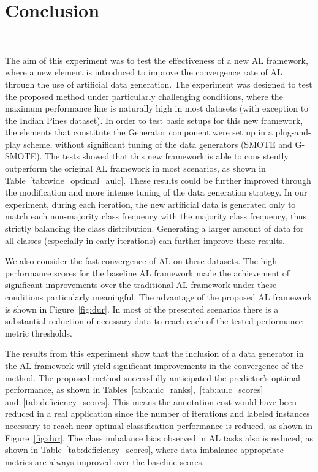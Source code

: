 \documentclass[preprint,12pt]{elsarticle}
\begin{document}
\section{Conclusion}~\label{sec:conclusion}

The aim of this experiment was to test the effectiveness of a new AL framework,
where a new element is introduced to improve the convergence rate of AL through
the use of artificial data generation. The experiment was designed to test the
proposed method under particularly challenging conditions, where the maximum
performance line is naturally high in most datasets (with exception to the
Indian Pines dataset). In order to test basic setups for this new framework,
the elements that constitute the Generator component were set up in a
plug-and-play scheme, without significant tuning of the data generators (SMOTE
and G-SMOTE). The tests showed that this new framework is able to consistently
outperform the original AL framework in most scenarios, as shown in
Table~\ref{tab:wide_optimal_aulc}. These results could be further improved
through the modification and more intense tuning of the data generation
strategy. In our experiment, during each iteration, the new artificial data is
generated only to match each non-majority class frequency with the majority
class frequency, thus strictly balancing the class distribution. Generating a
larger amount of data for all classes (especially in early iterations) can
further improve these results. 

We also consider the fast convergence of AL on these datasets. The high
performance scores for the baseline AL framework made the achievement of
significant improvements over the traditional AL framework under
these conditions particularly meaningful. The advantage of the proposed AL
framework is shown in Figure~\ref{fig:dur}. In most of the presented scenarios
there is a substantial reduction of necessary data to reach each of the tested
performance metric thresholds. 

The results from this experiment show that the inclusion of a data generator
in the AL framework will yield significant improvements in the convergence of
the method. The proposed method successfully anticipated the predictor's
optimal performance, as shown in
Tables~\ref{tab:aulc_ranks},~\ref{tab:aulc_scores}
and~\ref{tab:deficiency_scores}. This means the annotation cost would have
been reduced in a real application since the number of iterations and labeled
instances necessary to reach near optimal classification performance is
reduced, as shown in Figure~\ref{fig:dur}. The class imbalance bias observed
in AL tasks also is reduced, as shown in Table~\ref{tab:deficiency_scores},
where data imbalance appropriate metrics are always improved over the baseline
scores.
\end{document}
